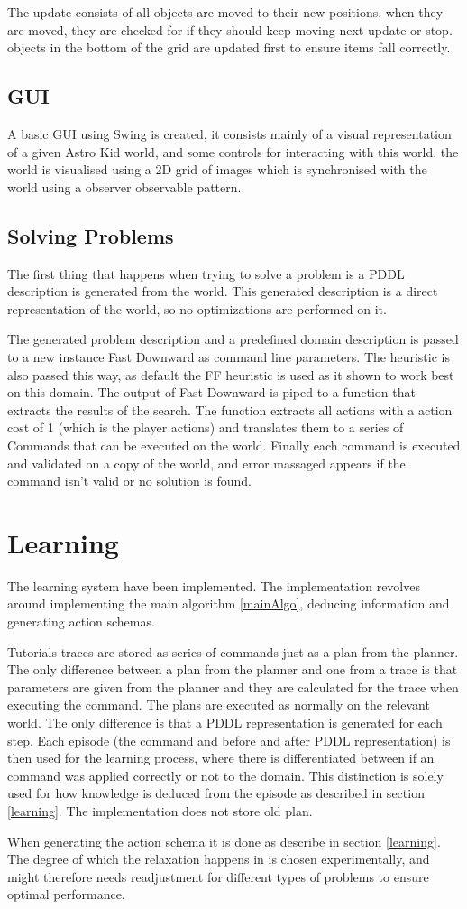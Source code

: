 	The update consists of all objects are moved to their new positions, when they are moved, they are checked for if they should keep moving next update or stop. objects in the bottom of the grid are updated first to ensure items fall correctly.
	
	
	\subsection{GUI}
	A basic GUI using Swing is created, it consists mainly of a visual representation of a given Astro Kid world, and some controls for interacting with this world. the world is visualised using a 2D grid of images which is synchronised with the world using a observer observable pattern.
	
	\subsection{Solving Problems}
	The first thing that happens when trying to solve a problem is a PDDL description is generated from the world. This generated description is a direct representation of the world, so no optimizations are performed on it.

	The generated problem description and a predefined domain description is passed to a new instance Fast Downward as command line parameters. The heuristic is also passed this way, as default the FF heuristic is used as it shown to work best on this domain. The output of Fast Downward is piped to a function that extracts the results of the search. The function extracts all actions with a action cost of 1 (which is the player actions) and translates them to a series of Commands that can be executed on the world. Finally each command is executed and validated on a copy of the world, and error massaged appears if the command isn't valid or no solution is found. 
	
\section{Learning}
	The learning system have been implemented. The implementation revolves around implementing the main algorithm \ref{mainAlgo}, deducing information and generating action schemas.
	

	
	Tutorials traces are stored as series of commands just as a plan from the planner. The only difference between a plan from the planner and one from a trace is that parameters are given from the planner and they are calculated for the trace when executing the command. The plans are executed as normally on the relevant world. The only difference is that a PDDL representation is generated for each step. Each episode (the command and before and after PDDL representation) is then used for the learning process, where there is differentiated between if an command was applied correctly or not to the domain. This distinction is solely used for how knowledge is deduced from the episode as described in section \ref{learning}. The implementation does not store old plan.
	

	When generating the action schema it is done as describe in section \ref{learning}.	The degree of which the relaxation happens in is chosen experimentally, and might therefore needs readjustment for different types of problems to ensure optimal performance.
	
